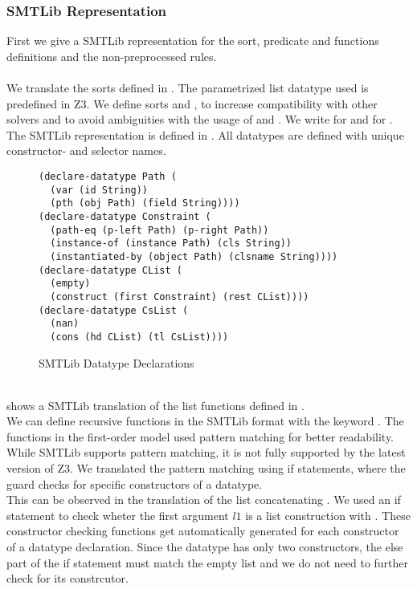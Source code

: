 \subsubsection{SMTLib Representation}
First we give a SMTLib representation for
the sort, predicate and functions definitions
and the non-preprocessed rules.\\
\\
We translate the sorts defined in .
The parametrized list datatype used is predefined in Z3.
We define sorts  and ,
to increase compatibility with other solvers
and to avoid ambiguities with the usage of \Constrs and \Constrss.
We write \Constrs for 
and \Constrss for .
The SMTLib representation is defined in .
All datatypes are defined with unique constructor- and selector names.
%
\begin{figure}[h]
\begin{lstlisting}[language=smtlib]
(declare-datatype Path (
  (var (id String))
  (pth (obj Path) (field String))))
(declare-datatype Constraint (
  (path-eq (p-left Path) (p-right Path))
  (instance-of (instance Path) (cls String))
  (instantiated-by (object Path) (clsname String))))
(declare-datatype CList (
  (empty)
  (construct (first Constraint) (rest CList))))
(declare-datatype CsList (
  (nan)
  (cons (hd CList) (tl CsList))))
\end{lstlisting}
\caption{SMTLib Datatype Declarations}
\label{fig:smtlib-sorts}
\end{figure}\\
%
 shows a SMTLib translation
of the list functions defined in .\\
We can define recursive functions in the SMTLib format
with the keyword .
The functions in the first-order model used pattern matching
for better readability. While SMTLib supports pattern matching,
it is not fully supported by the latest version of Z3.
We translated the pattern matching using if statements,
where the guard checks for specific constructors of a datatype.\\
This can be observed in the translation of the list concatenating .
We used an if statement to check wheter the first argument $l1$
is a list construction with .
These constructor checking functions get automatically
generated for each constructor of a datatype declaration.
Since the  datatype has only two constructors,
the else part of the if statement must match the empty list
and we do not need to further check for its constrcutor.

